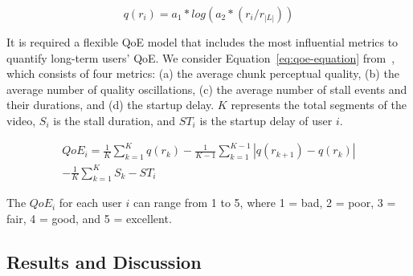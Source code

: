 \begin{equation}\label{eq:equation-1}
q(r_i) = a_1 * log(a_2 * (r_i/ r_{|L|}))
\end{equation}
\vspace{0.05cm}

It is required a flexible QoE model that includes the most influential metrics to quantify long-term users' QoE. 
We consider Equation~\ref{eq:qoe-equation} from~\cite{bentaleb:2018:MSys}, which consists of four metrics: (a) the average chunk perceptual quality, (b) the average number of quality oscillations, (c) the average number of stall events and their durations, and (d) the startup delay. $K$ represents the total segments of the video, $S_{i}$ is the stall duration, and $ST_{i}$ is the startup delay of user $i$.

\begin{equation}\label{eq:qoe-equation}
\begin{split}
QoE_i = \frac{1}{K} \sum_{k=1}^{K}q(r_{k}) - \frac{1}{K-1} \sum_{k=1}^{K-1}|q(r_{k+1}) - q(r_{k})| \\
- \frac{1}{K}\sum_{k=1}^{K} S_{k} - ST_{i}
\end{split}
\end{equation}
\vspace{0.05cm}

The $QoE_{i}$ for each user $i$ can range from 1 to 5, where 1 = bad, 2 = poor, 3 = fair, 4 = good, and 5 = excellent.

%

\subsection{Results and Discussion}


